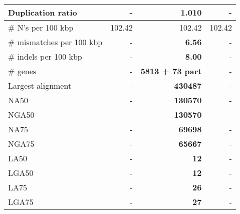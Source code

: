 \documentclass[12pt,a4paper]{article}
\begin{document}
\begin{table}[ht]
\begin{center}
\begin{tabular}{|l*{3}{|r}|}
Duplication ratio & - & {\bf 1.010} & - \\ \hline
\# N's per 100 kbp & 102.42 & 102.42 & 102.42 \\ \hline
\# mismatches per 100 kbp & - & {\bf 6.56} & - \\ \hline
\# indels per 100 kbp & - & {\bf 8.00} & - \\ \hline
\# genes & - & {\bf 5813 + 73 part} & - \\ \hline
Largest alignment & - & {\bf 430487} & - \\ \hline
NA50 & - & {\bf 130570} & - \\ \hline
NGA50 & - & {\bf 130570} & - \\ \hline
NA75 & - & {\bf 69698} & - \\ \hline
NGA75 & - & {\bf 65667} & - \\ \hline
LA50 & - & {\bf 12} & - \\ \hline
LGA50 & - & {\bf 12} & - \\ \hline
LA75 & - & {\bf 26} & - \\ \hline
LGA75 & - & {\bf 27} & - \\ \hline
\end{tabular}
\end{center}
\end{table}
\end{document}
